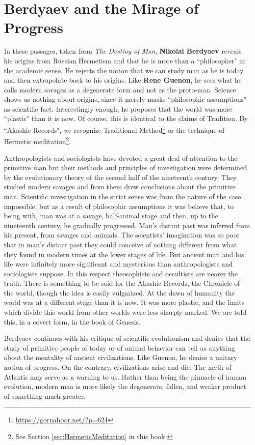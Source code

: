 \section{Berdyaev and the Mirage of Progress}

In these passages, taken from \emph{The Destiny of Man}, \textbf{Nikolai Berdyaev} reveals his origins from Russian Hermetism and that he is more than a ``philosopher" in the academic sense. He rejects the notion that we can study man as he is today and then extrapolate back to his origins. Like \textbf{Rene Guenon}, he sees what he calls modern savages as a degenerate form and not as the proto-man. Science shows us nothing about origins, since it merely masks ``philosophic assumptions" as scientific fact. Interestingly enough, he proposes that the world was more ``plastic" than it is now. Of course, this is identical to the claims of Tradition. By ``Akashic Records", we recognize Traditional Method\footnote{\url{https://gornahoor.net/?p=624}} or the technique of Hermetic meditation\footnote{See Section \ref{sec:HermeticMeditation} in this book.}.

\begin{quotex}
Anthropologists and sociologists have devoted a great deal of attention to the primitive man but their methods and principles of investigation were determined by the evolutionary theory of the second half of the nineteenth century. They studied modern savages and from them drew conclusions about the primitive man. Scientific investigation in the strict sense was from the nature of the case impossible, but as a result of philosophic assumptions it was believe that, to being with, man was at a savage, half-animal stage and then, up to the nineteenth century, he gradually progressed. Man's distant past was inferred from his present, from savages and animals. The scientists' imagination was so poor that in man's distant past they could conceive of nothing different from what they found in modern times at the lower stages of life. But ancient man and his life were infinitely more significant and mysterious than anthropologists and sociologists suppose. In this respect theosophists and occultists are nearer the truth. There is something to be said for the Akashic Records, the Chronicle of the world, though the idea is easily vulgarized. At the dawn of humanity the world was at a different stage than it is now. It was more plastic, and the limits which divide this world from other worlds were less sharply marked. We are told this, in a covert form, in the book of Genesis. 

\end{quotex}
Berdyaev continues with his critique of scientific evolutionism and denies that the study of primitive people of today or of animal behavior can tell us anything about the mentality of ancient civilizations. Like Guenon, he denies a unitary notion of progress. On the contrary, civilizations arise and die. The myth of Atlantis may serve as a warning to us. Rather than being the pinnacle of human evolution, modern man is more likely the degenerate, fallen, and weaker product of something much greater.

